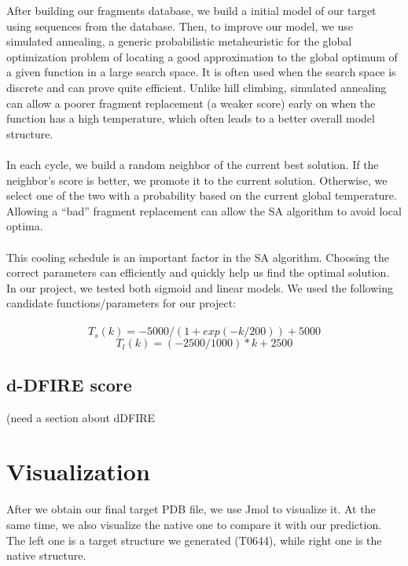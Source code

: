 \documentclass{article}
\begin{document}
\begin{enumerate}
After building our fragments database, we build a initial model of our target using sequences from the database. Then, to improve our model, we use simulated annealing, a generic probabilistic metaheuristic for the global optimization problem of locating a good approximation to the global optimum of a given function in a large search space. It is often used when the search space is discrete and can prove quite efficient. Unlike hill climbing, simulated annealing can allow a poorer fragment replacement (a weaker score) early on when the function has a high temperature, which often leads to a better overall model structure. \\\\
In each cycle, we build a random neighbor of the current best solution. If the neighbor’s score is better, we promote it to  the current solution. Otherwise, we select one of the two with a probability based on the current global temperature.  Allowing a “bad” fragment replacement can allow the SA algorithm to avoid local optima.  \\\\
     This cooling schedule is an important factor in the SA algorithm. Choosing the correct parameters can efficiently and quickly help us find the optimal solution. In our project, we tested both sigmoid and linear models. We used the following candidate functions/parameters for our project:\\\\
\begin{equation*}
      T_s(k) =  -5000/(1+ exp(-k/200))+5000
    \end{equation*}
\begin{equation*}
      T_l(k) =  (-2500/1000)*k + 2500
    \end{equation*}



\subsection{d-DFIRE score}

(need a section about dDFIRE

\newpage
\section{Visualization}

After we obtain our final target PDB file, we use Jmol to visualize it. At the same time, we also visualize the native one to compare it with our prediction.  The left one is a target structure we generated (T0644), while right one is the native structure.


\end{enumerate}
\end{document}
